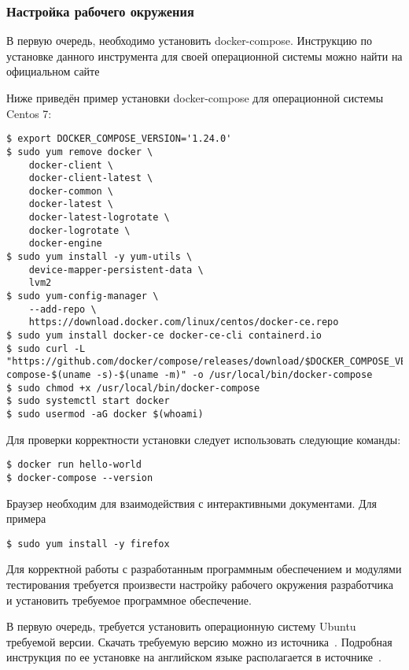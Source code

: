 \subsubsection{Настройка рабочего окружения}

В первую очередь, необходимо установить docker-compose.
Инструкцию по установке данного инструмента для своей операционной системы можно найти на официальном сайте ~\cite{docker_compose_install_site}

Ниже приведён пример установки docker-compose для операционной системы Centos 7:

\begin{lstlisting}
$ export DOCKER_COMPOSE_VERSION='1.24.0'
$ sudo yum remove docker \
    docker-client \
    docker-client-latest \
    docker-common \
    docker-latest \
    docker-latest-logrotate \
    docker-logrotate \
    docker-engine
$ sudo yum install -y yum-utils \
    device-mapper-persistent-data \
    lvm2
$ sudo yum-config-manager \
    --add-repo \
    https://download.docker.com/linux/centos/docker-ce.repo
$ sudo yum install docker-ce docker-ce-cli containerd.io
$ sudo curl -L "https://github.com/docker/compose/releases/download/$DOCKER_COMPOSE_VERSION/docker-compose-$(uname -s)-$(uname -m)" -o /usr/local/bin/docker-compose
$ sudo chmod +x /usr/local/bin/docker-compose
$ sudo systemctl start docker
$ sudo usermod -aG docker $(whoami)
\end{lstlisting}

Для проверки корректности установки следует использовать следующие команды:

\begin{lstlisting}
$ docker run hello-world
$ docker-compose --version
\end{lstlisting}

Браузер необходим для взаимодействия с интерактивными документами.
Для примера 

\begin{lstlisting}
$ sudo yum install -y firefox    
\end{lstlisting}



Для корректной работы с разработанным программным обеспечением и модулями
тестирования требуется произвести настройку рабочего окружения разработчика
и установить требуемое программное обеспечение.

В первую очередь, требуется установить операционную систему Ubuntu требуемой
версии. Скачать требуемую версию можно из источника~\cite{ubuntu_download_site}.
Подробная инструкция по ее установке на английском языке располагается
в источнике~\cite{ubuntu_how_to_install}.

